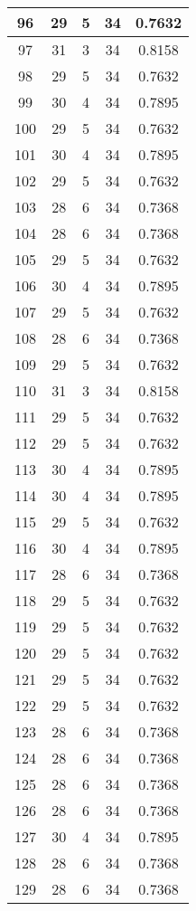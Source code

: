 \documentclass[letterpaper, 12pt]{article}
\begin{document}
\begin{longtable}{|c|c|c|c|c|}
\hline
96 & 29 & 5 & 34 & 0.7632 \\
\hline
97 & 31 & 3 & 34 & 0.8158 \\
\hline
98 & 29 & 5 & 34 & 0.7632 \\
\hline
99 & 30 & 4 & 34 & 0.7895 \\
\hline
100 & 29 & 5 & 34 & 0.7632 \\
\hline
101 & 30 & 4 & 34 & 0.7895 \\
\hline
102 & 29 & 5 & 34 & 0.7632 \\
\hline
103 & 28 & 6 & 34 & 0.7368 \\
\hline
104 & 28 & 6 & 34 & 0.7368 \\
\hline
105 & 29 & 5 & 34 & 0.7632 \\
\hline
106 & 30 & 4 & 34 & 0.7895 \\
\hline
107 & 29 & 5 & 34 & 0.7632 \\
\hline
108 & 28 & 6 & 34 & 0.7368 \\
\hline
109 & 29 & 5 & 34 & 0.7632 \\
\hline
110 & 31 & 3 & 34 & 0.8158 \\
\hline
111 & 29 & 5 & 34 & 0.7632 \\
\hline
112 & 29 & 5 & 34 & 0.7632 \\
\hline
113 & 30 & 4 & 34 & 0.7895 \\
\hline
114 & 30 & 4 & 34 & 0.7895 \\
\hline
115 & 29 & 5 & 34 & 0.7632 \\
\hline
116 & 30 & 4 & 34 & 0.7895 \\
\hline
117 & 28 & 6 & 34 & 0.7368 \\
\hline
118 & 29 & 5 & 34 & 0.7632 \\
\hline
119 & 29 & 5 & 34 & 0.7632 \\
\hline
120 & 29 & 5 & 34 & 0.7632 \\
\hline
121 & 29 & 5 & 34 & 0.7632 \\
\hline
122 & 29 & 5 & 34 & 0.7632 \\
\hline
123 & 28 & 6 & 34 & 0.7368 \\
\hline
124 & 28 & 6 & 34 & 0.7368 \\
\hline
125 & 28 & 6 & 34 & 0.7368 \\
\hline
126 & 28 & 6 & 34 & 0.7368 \\
\hline
127 & 30 & 4 & 34 & 0.7895 \\
\hline
128 & 28 & 6 & 34 & 0.7368 \\
\hline
129 & 28 & 6 & 34 & 0.7368 \\

\end{longtable}
\end{document}
